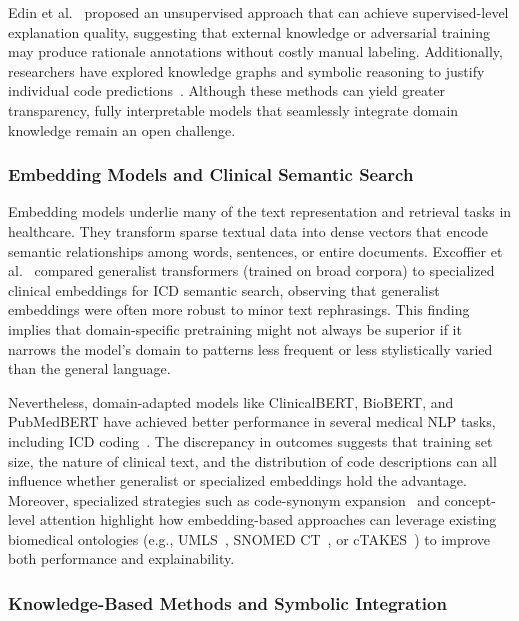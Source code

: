 Edin et al.~\citep{edin2024unsupervised} proposed an unsupervised approach that can achieve supervised-level explanation quality, suggesting that external knowledge or adversarial training may produce rationale annotations without costly manual labeling. Additionally, researchers have explored knowledge graphs and symbolic reasoning to justify individual code predictions~\citep{teng2020explainable}. Although these methods can yield greater transparency, fully interpretable models that seamlessly integrate domain knowledge remain an open challenge.

\subsubsection{Embedding Models and Clinical Semantic Search}

Embedding models underlie many of the text representation and retrieval tasks in healthcare. They transform sparse textual data into dense vectors that encode semantic relationships among words, sentences, or entire documents. Excoffier et al.~\citep{excoffier2024generalist} compared generalist transformers (trained on broad corpora) to specialized clinical embeddings for ICD semantic search, observing that generalist embeddings were often more robust to minor text rephrasings. This finding implies that domain-specific pretraining might not always be superior if it narrows the model's domain to patterns less frequent or less stylistically varied than the general language.

Nevertheless, domain-adapted models like ClinicalBERT, BioBERT, and PubMedBERT have achieved better performance in several medical NLP tasks, including ICD coding~\citep{gao2021limitations, ji2021bert}. The discrepancy in outcomes suggests that training set size, the nature of clinical text, and the distribution of code descriptions can all influence whether generalist or specialized embeddings hold the advantage. Moreover, specialized strategies such as code-synonym expansion~\citep{yuan2022codesynonyms} and concept-level attention highlight how embedding-based approaches can leverage existing biomedical ontologies (e.g., UMLS~\citep{bodenreider2004umls}, SNOMED CT~\citep{donnelly2006snomedct}, or cTAKES~\citep{savova2010ctakes}) to improve both performance and explainability.

\subsubsection{Knowledge-Based Methods and Symbolic Integration}

